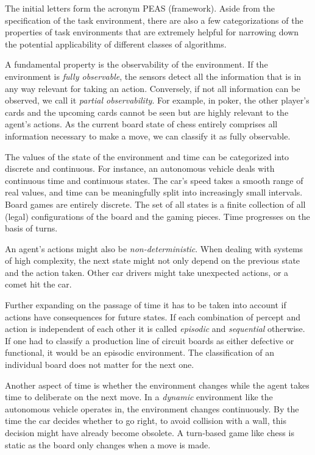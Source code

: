 The initial letters form the acronym PEAS (framework). Aside from the specification of the task environment, there are also a few categorizations of the properties of task environments that are extremely helpful for narrowing down the potential applicability of different classes of algorithms.

A fundamental property is the observability of the environment. If the environment is \textit{fully observable}, the sensors detect all the information that is in any way relevant for taking an action. Conversely, if not all information can be observed, we call it \textit{partial observability}. For example, in poker, the other player's cards and the upcoming cards cannot be seen but are highly relevant to the agent's actions. As the current board state of chess entirely comprises all information necessary to make a move, we can classify it as fully observable.

The values of the state of the environment and time can be categorized into discrete and continuous. For instance, an autonomous vehicle deals with continuous time and continuous states. The car's speed takes a smooth range of real values, and time can be meaningfully split into increasingly small intervals. Board games are entirely discrete. The set of all states is a finite collection of all (legal) configurations of the board and the gaming pieces. Time progresses on the basis of turns.

An agent's actions might also be \textit{non-deterministic}. When dealing with systems of high complexity, the next state might not only depend on the previous state and the action taken. Other car drivers might take unexpected actions, or a comet hit the car.

Further expanding on the passage of time it has to be taken into account if actions have consequences for future states. If each combination of percept and action is independent of each other it is called \textit{episodic} and \textit{sequential} otherwise. If one had to classify a production line of circuit boards as either defective or functional, it would be an episodic environment. The classification of an individual board does not matter for the next one.

Another aspect of time is whether the environment changes while the agent takes time to deliberate on the next move. In a \textit{dynamic} environment like the autonomous vehicle operates in, the environment changes continuously. By the time the car decides whether to go right, to avoid collision with a wall, this decision might have already become obsolete. A  turn-based game like chess is static as the board only changes when a move is made.

